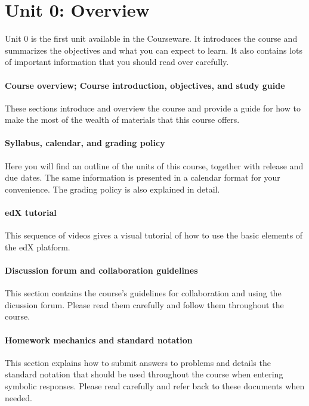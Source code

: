 \documentclass[pdftex, brazil, 12pt, twoside]{article}
\begin{document}
\section{Unit 0: Overview}
\label{ovw0}

Unit 0 is the first unit available in the Courseware. It introduces the course and
summarizes the objectives and what you can expect to learn. It also contains lots
of important information that you should read over carefully.

\paragraph{Course overview; Course introduction, objectives, and study guide}
These sections introduce and overview the course and provide a guide for how to
make the most of the wealth of materials that this course offers.

\paragraph{Syllabus, calendar, and grading policy}
Here you will find an outline of the units of this course, together with release
and due dates. The same information is presented in a calendar format for your
convenience. The grading policy is also explained in detail.

\paragraph{edX tutorial}
This sequence of videos gives a visual tutorial of how to use the basic elements
of the edX platform.

\paragraph{Discussion forum and collaboration guidelines}
This section contains the course's guidelines for collaboration and using the
dicussion forum. Please read them carefully and follow them throughout the course.

\paragraph{Homework mechanics and standard notation}
This section explains how to submit answers to problems and details the standard
notation that should be used throughout the course when entering symbolic responses.
Please read carefully and refer back to these documents when needed.
\end{document}
